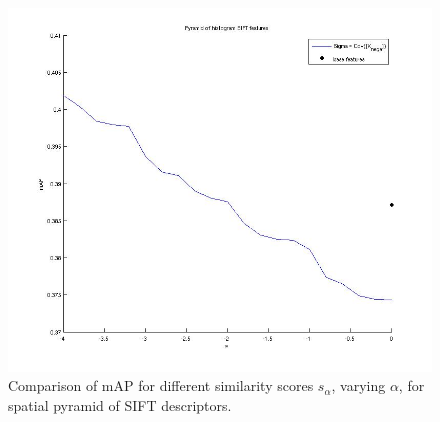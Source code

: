 \documentclass[12pt,letterpaper]{article}
\begin{document}
\begin{figure}
\centering
\includegraphics[width=.45\textwidth]{whitening_pyr.jpg}
\caption{Comparison of mAP for different similarity scores $s_{\alpha}$, varying $\alpha$, for spatial pyramid of SIFT descriptors.}
\label{salpha:pyr}
\end{figure}


 

\end{document}
